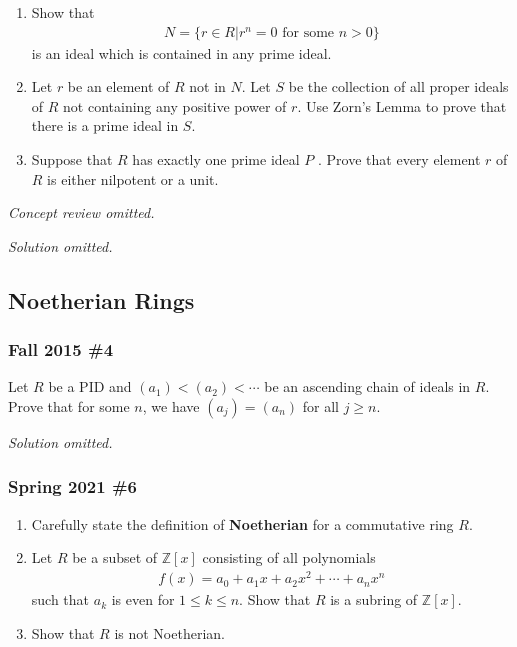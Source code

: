 \begin{enumerate}
\def\labelenumi{\alph{enumi}.}
\item
  Show that
  \begin{align*}
  N = \{r \in R \mathrel{\Big|}r^n = 0 \text{ for some } n > 0\}
  \end{align*}
  is an ideal which is contained in any prime ideal.
\item
  Let \(r\) be an element of \(R\) not in \(N\). Let \(S\) be the
  collection of all proper ideals of \(R\) not containing any positive
  power of \(r\). Use Zorn's Lemma to prove that there is a prime ideal
  in \(S\).
\item
  Suppose that \(R\) has exactly one prime ideal \(P\) . Prove that
  every element \(r\) of \(R\) is either nilpotent or a unit.
\end{enumerate}

\emph{Concept review omitted.}

\emph{Solution omitted.}

\hypertarget{noetherian-rings}{%
\subsection{Noetherian Rings}\label{noetherian-rings}}

\hypertarget{fall-2015-4}{%
\subsubsection{Fall 2015 \#4}\label{fall-2015-4}}

Let \(R\) be a PID and \((a_1) < (a_2) < \cdots\) be an ascending chain
of ideals in \(R\). Prove that for some \(n\), we have \((a_j) = (a_n)\)
for all \(j\geq n\).

\emph{Solution omitted.}

\hypertarget{spring-2021-6}{%
\subsubsection{Spring 2021 \#6}\label{spring-2021-6}}

\begin{enumerate}
\def\labelenumi{\alph{enumi}.}
\item
  Carefully state the definition of \textbf{Noetherian} for a
  commutative ring \(R\).
\item
  Let \(R\) be a subset of \({\mathbb{Z}}[x]\) consisting of all
  polynomials
  \begin{align*}
  f(x) = a_ 0 + a_1 x + a_2 x^2 + \cdots + a_nx^n
  \end{align*}
  such that \(a_k\) is even for \(1\leq k \leq n\). Show that \(R\) is a
  subring of \({\mathbb{Z}}[x]\).
\item
  Show that \(R\) is not Noetherian.
\end{enumerate}

